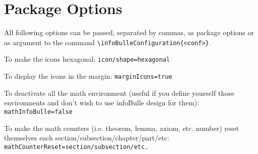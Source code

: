 \documentclass[a4paper, 11pt, oneside, fleqn]{article}
\begin{document}
\section{Package Options}
All following options can be passed, separated by commas, as package options or as argument to the command \verb|\infoBulleConfiguration{<conf>}|.

To make the icons hexagonal: \verb|icon/shape=hexagonal|

To display the icons in the margin: \verb|marginIcons=true|

To deactivate all the math environment (useful if you define yourself those environments and don't wish to use infoBulle design for them): \verb|mathInfoBulle=false|

To make the math counters (i.e. theorem, lemma, axiom, etc. number) reset themselves each section/subsection/chapter/part/etc: \verb|mathCounterReset=section/subsection/etc.|
\end{document}
